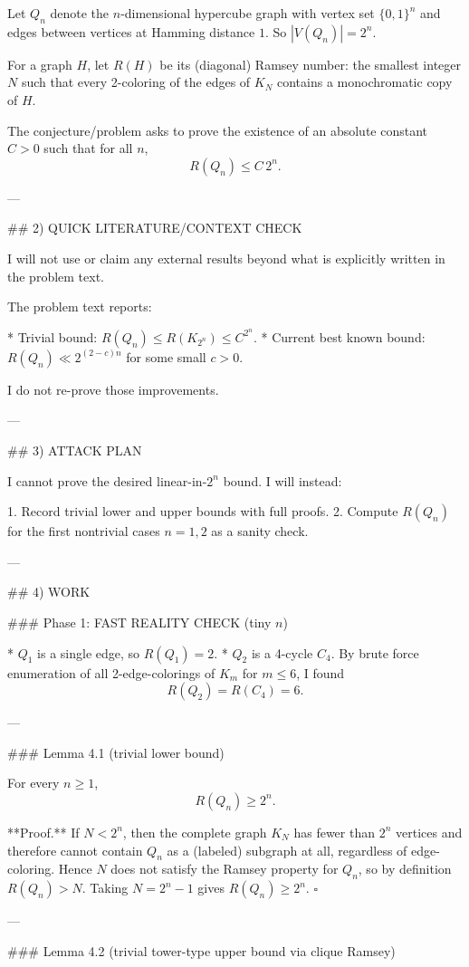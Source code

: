 Let $Q_n$ denote the $n$-dimensional hypercube graph with vertex set $\{0,1\}^n$ and edges between vertices at Hamming distance $1$.
So $|V(Q_n)|=2^n$.

For a graph $H$, let $R(H)$ be its (diagonal) Ramsey number: the smallest integer $N$ such that every 2-coloring of the edges of $K_N$ contains a monochromatic copy of $H$.

The conjecture/problem asks to prove the existence of an absolute constant $C>0$ such that for all $n$,
\[
R(Q_n)\le C\,2^n.
\]

---

## 2) QUICK LITERATURE/CONTEXT CHECK

I will not use or claim any external results beyond what is explicitly written in the problem text.

The problem text reports:

* Trivial bound: $R(Q_n)\le R(K_{2^n})\le C^{2^n}$.
* Current best known bound: $R(Q_n)\ll 2^{(2-c)n}$ for some small $c>0$.

I do not re-prove those improvements.

---

## 3) ATTACK PLAN

I cannot prove the desired linear-in-$2^n$ bound. I will instead:

1. Record trivial lower and upper bounds with full proofs.
2. Compute $R(Q_n)$ for the first nontrivial cases $n=1,2$ as a sanity check.

---

## 4) WORK

### Phase 1: FAST REALITY CHECK (tiny $n$)

* $Q_1$ is a single edge, so $R(Q_1)=2$.
* $Q_2$ is a 4-cycle $C_4$. By brute force enumeration of all 2-edge-colorings of $K_m$ for $m\le 6$, I found
\[
R(Q_2)=R(C_4)=6.
\]

---

### Lemma 4.1 (trivial lower bound)

For every $n\ge 1$,
\[
R(Q_n)\ge 2^n.
\]

**Proof.**
If $N<2^n$, then the complete graph $K_N$ has fewer than $2^n$ vertices and therefore cannot contain $Q_n$ as a (labeled) subgraph at all, regardless of edge-coloring.
Hence $N$ does not satisfy the Ramsey property for $Q_n$, so by definition $R(Q_n)>N$.
Taking $N=2^n-1$ gives $R(Q_n)\ge 2^n$.
$\square$

---

### Lemma 4.2 (trivial tower-type upper bound via clique Ramsey)


